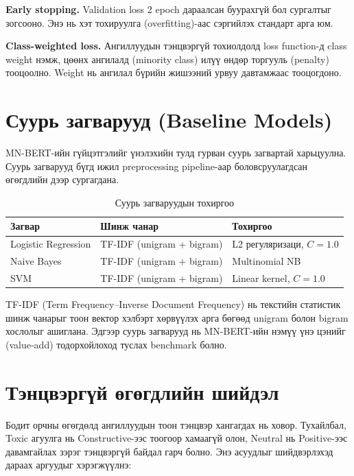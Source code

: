 \textbf{Early stopping.} Validation loss 2 epoch дараалсан буурахгүй бол
сургалтыг зогсооно. Энэ нь хэт тохируулга (overfitting)-аас сэргийлэх
стандарт арга юм.

\textbf{Class-weighted loss.} Ангиллуудын тэнцвэргүй тохиолдолд loss
function-д class weight нэмж, цөөнх ангилалд (minority class) илүү өндөр
торгууль (penalty) тооцоолно. Weight нь ангилал бүрийн жишээний
урвуу давтамжаас тооцогдоно.

\section{Суурь загварууд (Baseline Models)}

MN-BERT-ийн гүйцэтгэлийг үнэлэхийн тулд гурван суурь загвартай харьцуулна.
Суурь загварууд бүгд ижил preprocessing pipeline-аар боловсруулагдсан
өгөгдлийн дээр сургагдана.

\begin{table}[H]
\centering
\caption{Суурь загваруудын тохиргоо}
\label{tab:baselines}
\begin{tabular}{@{}lll@{}}
\toprule
\textbf{Загвар} & \textbf{Шинж чанар} & \textbf{Тохиргоо} \\
\midrule
Logistic Regression & TF-IDF (unigram + bigram) & L2 регуляризаци, $C=1.0$ \\
Naive Bayes         & TF-IDF (unigram + bigram) & Multinomial NB \\
SVM                 & TF-IDF (unigram + bigram) & Linear kernel, $C=1.0$ \\
\bottomrule
\end{tabular}
\end{table}

TF-IDF (Term Frequency--Inverse Document Frequency) нь текстийн статистик
шинж чанарыг тоон вектор хэлбэрт хөрвүүлэх арга бөгөөд unigram болон bigram
хослолыг ашиглана. Эдгээр суурь загварууд нь MN-BERT-ийн нэмүү үнэ цэнийг
(value-add) тодорхойлоход туслах benchmark болно.

\section{Тэнцвэргүй өгөгдлийн шийдэл}

Бодит орчны өгөгдөлд ангиллуудын тоон тэнцвэр хангагдах нь ховор. Тухайлбал,
Toxic агуулга нь Constructive-ээс тоогоор хамаагүй олон, Neutral нь Positive-ээс
давамгайлах зэрэг тэнцвэргүй байдал гарч болно. Энэ асуудлыг шийдвэрлэхэд
дараах аргуудыг хэрэгжүүлнэ:


